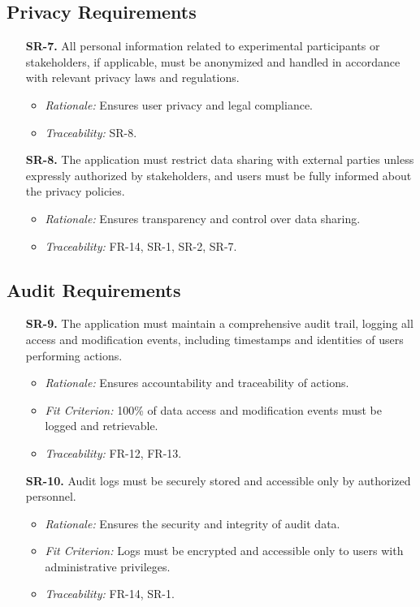 \documentclass[12pt]{article}
\begin{document}
\subsection{Privacy Requirements}
\begin{enumerate}
  \item[\textbf{SR-7.}] All personal information related to experimental
  participants or stakeholders, if applicable, must be anonymized and handled in
  accordance with relevant privacy laws and regulations.
  \begin{itemize}
    \item \textit{Rationale:} Ensures user privacy and legal compliance.
    \item \textit{Traceability:} SR-8.
  \end{itemize}

  \item[\textbf{SR-8.}] The application must restrict data sharing with external
  parties unless expressly authorized by stakeholders, and users must be fully
  informed about the privacy policies.
  \begin{itemize}
    \item \textit{Rationale:} Ensures transparency and control over data
    sharing.
    \item \textit{Traceability:} FR-14, SR-1, SR-2, SR-7.
  \end{itemize}
\end{enumerate}

\subsection{Audit Requirements}
\begin{enumerate}
  \item[\textbf{SR-9.}] The application must maintain a comprehensive audit
  trail, logging all access and modification events, including timestamps and
  identities of users performing actions.
  \begin{itemize}
    \item \textit{Rationale:} Ensures accountability and traceability of
    actions.
    \item \textit{Fit Criterion:} 100\% of data access and modification events
    must be logged and retrievable.
    \item \textit{Traceability:} FR-12, FR-13.
  \end{itemize}

  \item[\textbf{SR-10.}] Audit logs must be securely stored and accessible only
  by authorized personnel.
  \begin{itemize}
    \item \textit{Rationale:} Ensures the security and integrity of audit data.
    \item \textit{Fit Criterion:} Logs must be encrypted and accessible only to
    users with administrative privileges.
    \item \textit{Traceability:} FR-14, SR-1.
  \end{itemize}
\end{enumerate}
\end{document}

